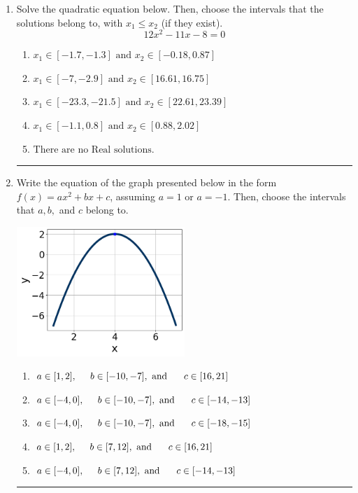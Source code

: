 \documentclass[14pt]{extbook}
\newcommand{\litem}[1]{\item#1\hspace*{-1cm}\rule{\textwidth}{0.4pt}}
\begin{document}
\begin{enumerate}
{\begin{enumerate}[label=\Alph*.]
\end{enumerate} }
\litem{
Solve the quadratic equation below. Then, choose the intervals that the solutions belong to, with $x_1 \leq x_2$ (if they exist).\[ 12x^{2} -11 x -8 = 0 \]\begin{enumerate}[label=\Alph*.]
\item \( x_1 \in [-1.7, -1.3] \text{ and } x_2 \in [-0.18, 0.87] \)
\item \( x_1 \in [-7, -2.9] \text{ and } x_2 \in [16.61, 16.75] \)
\item \( x_1 \in [-23.3, -21.5] \text{ and } x_2 \in [22.61, 23.39] \)
\item \( x_1 \in [-1.1, 0.8] \text{ and } x_2 \in [0.88, 2.02] \)
\item \( \text{There are no Real solutions.} \)

\end{enumerate} }
\litem{
Write the equation of the graph presented below in the form $f(x)=ax^2+bx+c$, assuming  $a=1$ or $a=-1$. Then, choose the intervals that $a, b,$ and $c$ belong to.
\begin{center}
    \includegraphics[width=0.5\textwidth]{../Figures/quadraticGraphToEquationCopyB.png}
\end{center}
\begin{enumerate}[label=\Alph*.]
\item \( a \in [1, 2], \hspace*{5mm} b \in [-10, -7], \text{ and } \hspace*{5mm} c \in [16, 21] \)
\item \( a \in [-4, 0], \hspace*{5mm} b \in [-10, -7], \text{ and } \hspace*{5mm} c \in [-14, -13] \)
\item \( a \in [-4, 0], \hspace*{5mm} b \in [-10, -7], \text{ and } \hspace*{5mm} c \in [-18, -15] \)
\item \( a \in [1, 2], \hspace*{5mm} b \in [7, 12], \text{ and } \hspace*{5mm} c \in [16, 21] \)
\item \( a \in [-4, 0], \hspace*{5mm} b \in [7, 12], \text{ and } \hspace*{5mm} c \in [-14, -13] \)


\end{enumerate}}
\end{enumerate}
\end{document}
